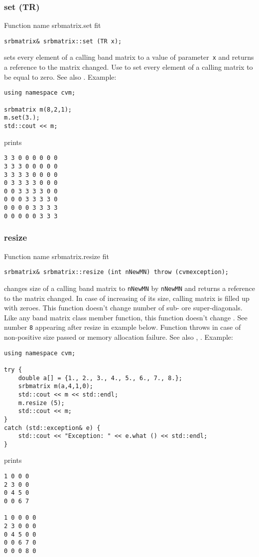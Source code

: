 \subsubsection{set (TR)}
Function%
\pdfdest name {srbmatrix.set} fit
\begin{verbatim}
srbmatrix& srbmatrix::set (TR x);
\end{verbatim}
sets every element of a calling band matrix to a value of
parameter~\verb"x" and returns a reference to
the matrix changed.
Use  to set every element
of a calling matrix to be equal to zero.
See also .
Example:
\begin{Verbatim}
using namespace cvm;

srbmatrix m(8,2,1);
m.set(3.);
std::cout << m;
\end{Verbatim}
prints
\begin{Verbatim}
3 3 0 0 0 0 0 0
3 3 3 0 0 0 0 0
3 3 3 3 0 0 0 0
0 3 3 3 3 0 0 0
0 0 3 3 3 3 0 0
0 0 0 3 3 3 3 0
0 0 0 0 3 3 3 3
0 0 0 0 0 3 3 3
\end{Verbatim}
\newpage



\subsubsection{resize}
Function%
\pdfdest name {srbmatrix.resize} fit
\begin{verbatim}
srbmatrix& srbmatrix::resize (int nNewMN) throw (cvmexception);
\end{verbatim}
changes  size of a calling band matrix to \verb"nNewMN" by \verb"nNewMN"
and returns a reference to
the matrix changed. In case of increasing of its size, calling matrix
is filled up with zeroes. This function doesn't change
 number of sub- ore super-diagonals. Like any band matrix 
class member function, this function doesn't change 
. 
See number \verb"8" appearing after
resize in example below.
Function throws  
in case of non-positive size passed or memory allocation failure.
See also ,
.
Example:
\begin{Verbatim}
using namespace cvm;

try {
    double a[] = {1., 2., 3., 4., 5., 6., 7., 8.};
    srbmatrix m(a,4,1,0);
    std::cout << m << std::endl;
    m.resize (5);
    std::cout << m;
}
catch (std::exception& e) {
    std::cout << "Exception: " << e.what () << std::endl;
}
\end{Verbatim}
prints
\begin{Verbatim}
1 0 0 0
2 3 0 0
0 4 5 0
0 0 6 7

1 0 0 0 0
2 3 0 0 0
0 4 5 0 0
0 0 6 7 0
0 0 0 8 0
\end{Verbatim}
\newpage






